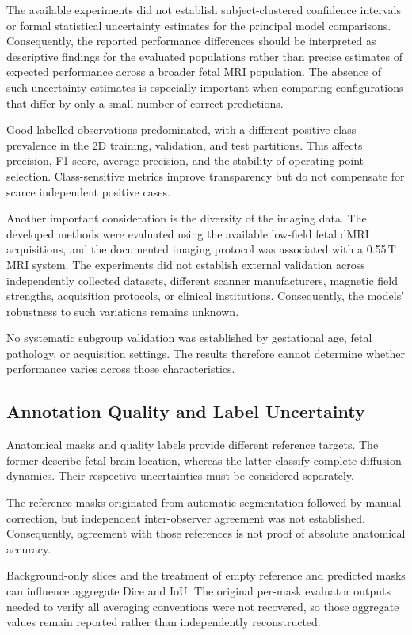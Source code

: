 The available experiments did not establish subject-clustered confidence intervals or formal statistical uncertainty estimates for the principal model comparisons. Consequently, the reported performance differences should be interpreted as descriptive findings for the evaluated populations rather than precise estimates of expected performance across a broader fetal MRI population. The absence of such uncertainty estimates is especially important when comparing configurations that differ by only a small number of correct predictions.

Good-labelled observations predominated, with a different positive-class prevalence in the 2D training, validation, and test partitions. This affects precision, F1-score, average precision, and the stability of operating-point selection. Class-sensitive metrics improve transparency but do not compensate for scarce independent positive cases.

Another important consideration is the diversity of the imaging data. The developed methods were evaluated using the available low-field fetal dMRI acquisitions, and the documented imaging protocol was associated with a 0.55\,T MRI system. The experiments did not establish external validation across independently collected datasets, different scanner manufacturers, magnetic field strengths, acquisition protocols, or clinical institutions. Consequently, the models' robustness to such variations remains unknown.

No systematic subgroup validation was established by gestational age, fetal pathology, or acquisition settings. The results therefore cannot determine whether performance varies across those characteristics.

\subsection{Annotation Quality and Label Uncertainty}

Anatomical masks and quality labels provide different reference targets. The former describe fetal-brain location, whereas the latter classify complete diffusion dynamics. Their respective uncertainties must be considered separately.

The reference masks originated from automatic segmentation followed by manual correction, but independent inter-observer agreement was not established. Consequently, agreement with those references is not proof of absolute anatomical accuracy.

Background-only slices and the treatment of empty reference and predicted masks can influence aggregate Dice and IoU. The original per-mask evaluator outputs needed to verify all averaging conventions were not recovered, so those aggregate values remain reported rather than independently reconstructed.


